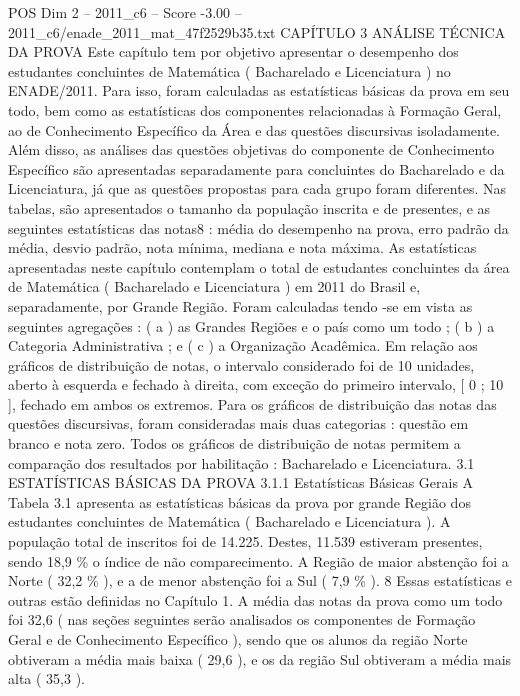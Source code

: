 \begin{textsample}{POS Dim 2 – 2011\_c6 – Score -3.00 – 2011\_c6/enade\_2011\_mat\_47f2529b35.txt}  \label{ex:f2_pos_413}
CAPÍTULO 3 ANÁLISE TÉCNICA DA PROVA Este capítulo tem por objetivo apresentar o desempenho dos estudantes concluintes de Matemática ( Bacharelado e Licenciatura ) no ENADE/2011.
Para isso, foram calculadas as estatísticas básicas da prova em seu todo, bem como as estatísticas dos componentes relacionadas à Formação Geral, ao de Conhecimento Específico da Área e das questões discursivas isoladamente.
Além disso, as análises das questões objetivas do componente de Conhecimento Específico são apresentadas separadamente para concluintes do Bacharelado e da Licenciatura, já que as questões propostas para cada grupo foram diferentes.
Nas tabelas, são apresentados o tamanho da população inscrita e de presentes, e as seguintes estatísticas das notas8 : média do desempenho na prova, erro padrão da média, desvio padrão, nota mínima, mediana e nota máxima.
As estatísticas apresentadas neste capítulo contemplam o total de estudantes concluintes da área de Matemática ( Bacharelado e Licenciatura ) em 2011 do Brasil e, separadamente, por Grande Região.
Foram calculadas tendo -se em vista as seguintes agregações : ( a ) as Grandes Regiões e o país como um todo ; ( b ) a Categoria Administrativa ; e ( c ) a Organização Acadêmica.
Em relação aos gráficos de distribuição de notas, o intervalo considerado foi de 10 unidades, aberto à esquerda e fechado à direita, com exceção do primeiro intervalo, [ 0 ; 10 ], fechado em ambos os extremos.
Para os gráficos de distribuição das notas das questões discursivas, foram consideradas mais duas categorias : questão em branco e nota zero.
Todos os gráficos de distribuição de notas permitem a comparação dos resultados por habilitação : Bacharelado e Licenciatura. 3.1 ESTATÍSTICAS BÁSICAS DA PROVA 3.1.1 Estatísticas Básicas Gerais A Tabela 3.1 apresenta as estatísticas básicas da prova por grande Região dos estudantes concluintes de Matemática ( Bacharelado e Licenciatura ).
A população total de inscritos foi de 14.225.
Destes, 11.539 estiveram presentes, sendo 18,9 \% o índice de não comparecimento.
A Região de maior abstenção foi a Norte ( 32,2 \% ), e a de menor abstenção foi a Sul ( 7,9 \% ). 8 Essas estatísticas e outras estão definidas no Capítulo 1.
A média das notas da prova como um todo foi 32,6 ( nas seções seguintes serão analisados os componentes de Formação Geral e de Conhecimento Específico ), sendo que os alunos da região Norte obtiveram a média mais baixa ( 29,6 ), e os da região Sul obtiveram a média mais alta ( 35,3 ).

\end{textsample}
